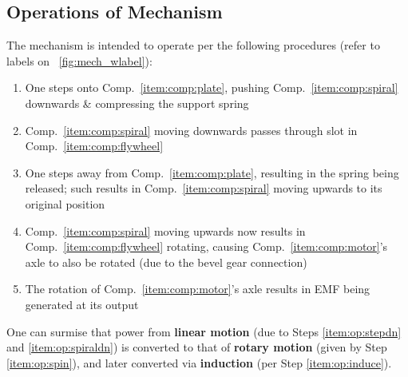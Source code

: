 \documentclass[conference]{ieeetran}
\newcommand{\figref}[1]{\figurename~\ref{#1}}
\newcommand{\compref}[1]{Comp.~\ref{#1}}
\begin{document}
\subsection{Operations of Mechanism}
The mechanism is intended to operate per the following procedures (refer to labels on \figref{fig:mech_wlabel}):
\begin{enumerate}
    \item\label{item:op:stepdn} One steps onto \compref{item:comp:plate}, pushing \compref{item:comp:spiral} downwards \& compressing the support spring
    \item\label{item:op:spiraldn} \compref{item:comp:spiral} moving downwards passes through slot in \compref{item:comp:flywheel}
    \item\label{item:op:stepup} One steps away from \compref{item:comp:plate}, resulting in the spring being released; such results in \compref{item:comp:spiral} moving upwards to its original position
    \item\label{item:op:spin} \compref{item:comp:spiral} moving upwards now results in \compref{item:comp:flywheel} rotating, causing \compref{item:comp:motor}'s axle to also be rotated (due to the bevel gear connection)
    \item\label{item:op:induce} The rotation of \compref{item:comp:motor}'s axle results in EMF being generated at its output
\end{enumerate}

One can surmise that power from \textbf{linear motion} (due to Steps \ref{item:op:stepdn} and \ref{item:op:spiraldn}) is converted to that of \textbf{rotary motion} (given by Step \ref{item:op:spin}), and later converted via \textbf{induction} (per Step \ref{item:op:induce}).


\end{document}
